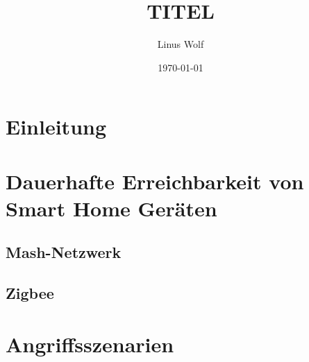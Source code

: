 \documentclass[12pt, a4paper, onecolumn, oneside, toc=bibliographynumbered, liststotoc]{scrartcl} %
\begin{document}
	\titlehead{Hochschule Rhein-Waal \\ %
	Fakultät: Kommunikation und Umwelt\\
	Studiengang: Verwaltungsinformatik\\
	Modul: XXXXXXXXXXXXXXXX\\}
	\title{TITEL} %
	\author{Linus Wolf}
	\date{\today} %




	\section{Einleitung}

	\section{Dauerhafte Erreichbarkeit von Smart Home Geräten}
		\subsection{Mash-Netzwerk}
		\subsection{Zigbee}
	
	\section{Angriffsszenarien}
\end{document}
